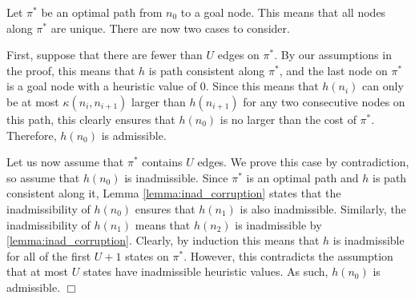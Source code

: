 \documentclass[letterpaper]{article}
\newenvironment{proof}{\par\noindent{\em Proof.}}{\hfill $\Box$\medskip}
\begin{document}
\begin{proof}
Let $\pi^*$ be an optimal path from $n_0$ to a goal node. This means that all nodes along $\pi^*$ are unique. There are now two cases to consider.

First, suppose that there are fewer than $U$ edges on $\pi^*$. By our assumptions in the proof, this means that $h$ is path consistent along $\pi^*$, and the last node on $\pi^*$ is a goal node with a heuristic value of $0$. Since this means that $h(n_i)$ can only be at most $\kappa(n_i, n_{i+1})$ larger than $h(n_{i+1})$ for any two consecutive nodes on this path, this clearly ensures that $h(n_0)$ is no larger than the cost of $\pi^*$. Therefore, $h(n_0)$ is admissible.

Let us now assume that $\pi^*$ contains $U$ edges. We prove this case by contradiction, so assume that $h(n_0)$ is inadmissible. Since $\pi^*$ is an optimal path and $h$ is path consistent along it, Lemma \ref{lemma:inad_corruption} states that the inadmissibility of $h(n_0)$ ensures that $h(n_1)$ is also inadmissible. Similarly, the inadmissibility of $h(n_1)$ means that $h(n_2)$ is inadmissible by \ref{lemma:inad_corruption}. Clearly, by induction this means that $h$ is inadmissible for all of the first $U+1$ states on $\pi^*$. However, this contradicts the assumption that at most $U$ states have inadmissible heuristic values. As such, $h(n_0)$ is admissible.
%
%
%
%
\end{proof}
\end{document}
